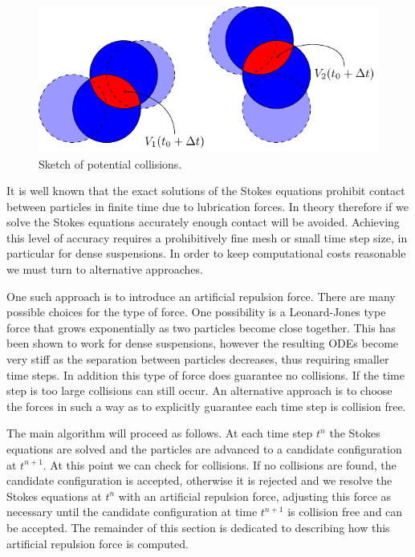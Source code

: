 \documentclass[preprint, 10pt]{elsarticle}
\begin{document}
\begin{figure}[!h]\label{fig:collision_sketch}
\begin{center}
\includegraphics{figures/collisions.pdf}
\end{center}
\caption{Sketch of potential collisions.}
\end{figure}
It is well known that the exact solutions of the Stokes equations prohibit contact between particles in finite time due to lubrication forces. In theory therefore if we solve the Stokes equations accurately enough contact will be avoided. Achieving this level of accuracy requires a prohibitively fine mesh or small time step size, in particular for dense suspensions. In order to keep computational costs reasonable we must turn to alternative approaches. 

One such approach is to introduce an artificial repulsion force. There are many possible choices for the type of force. One possibility is a Leonard-Jones type force that grows exponentially as two particles become close together. This has been shown to work for dense suspensions, however the resulting ODEs become very stiff as the separation between particles decreases, thus requiring smaller time steps. In addition this type of force does guarantee no collisions. If the time step is too large collisions can still occur. An alternative approach is to choose the forces in such a way as to explicitly guarantee each time step is collision free. 

The main algorithm will proceed as follows. At each time step $t^n$ the Stokes equations are solved and the particles are advanced to a candidate configuration at $t^{n+1}$. At this point we can check for collisions. If no collisions are found, the candidate configuration is accepted, otherwise it is rejected and we resolve the Stokes equations at $t^n$ with an artificial repulsion force, adjusting this force as necessary until the candidate configuration at time $t^{n+1}$ is collision free and can be accepted. The remainder of this section is dedicated to describing how this artificial repulsion force is computed. 
\end{document}
